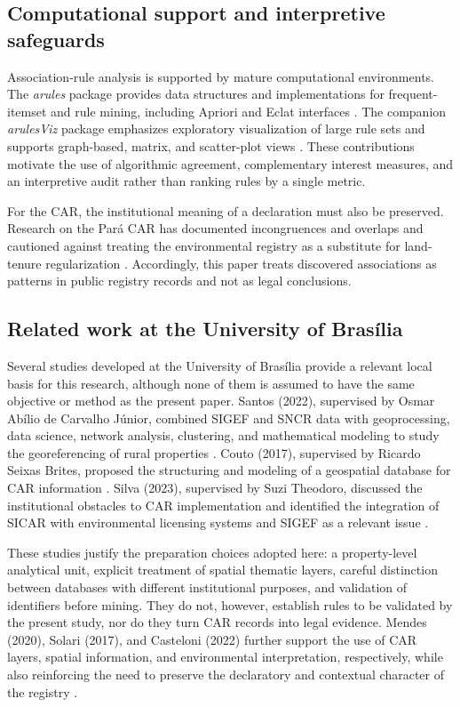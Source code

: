 \documentclass[11pt]{article}
\begin{document}
\subsection{Computational support and interpretive safeguards}

Association-rule analysis is supported by mature computational environments. The \textit{arules} package provides data structures and implementations for frequent-itemset and rule mining, including Apriori and Eclat interfaces \citep{hahsler2005}. The companion \textit{arulesViz} package emphasizes exploratory visualization of large rule sets and supports graph-based, matrix, and scatter-plot views \citep{hahsler2017}. These contributions motivate the use of algorithmic agreement, complementary interest measures, and an interpretive audit rather than ranking rules by a single metric.

For the CAR, the institutional meaning of a declaration must also be preserved. Research on the Pará CAR has documented incongruences and overlaps and cautioned against treating the environmental registry as a substitute for land-tenure regularization \citep{tupiassu2017}. Accordingly, this paper treats discovered associations as patterns in public registry records and not as legal conclusions.

\subsection{Related work at the University of Bras\'ilia}

Several studies developed at the University of Bras\'ilia provide a relevant local basis for this research, although none of them is assumed to have the same objective or method as the present paper. Santos (2022), supervised by Osmar Ab\'ilio de Carvalho J\'unior, combined SIGEF and SNCR data with geoprocessing, data science, network analysis, clustering, and mathematical modeling to study the georeferencing of rural properties \citep{santos2022}. Couto (2017), supervised by Ricardo Seixas Brites, proposed the structuring and modeling of a geospatial database for CAR information \citep{couto2017}. Silva (2023), supervised by Suzi Theodoro, discussed the institutional obstacles to CAR implementation and identified the integration of SICAR with environmental licensing systems and SIGEF as a relevant issue \citep{silva2023}.

These studies justify the preparation choices adopted here: a property-level analytical unit, explicit treatment of spatial thematic layers, careful distinction between databases with different institutional purposes, and validation of identifiers before mining. They do not, however, establish rules to be validated by the present study, nor do they turn CAR records into legal evidence. Mendes (2020), Solari (2017), and Casteloni (2022) further support the use of CAR layers, spatial information, and environmental interpretation, respectively, while also reinforcing the need to preserve the declaratory and contextual character of the registry \citep{mendes2020,solari2017,casteloni2022}.
\end{document}
